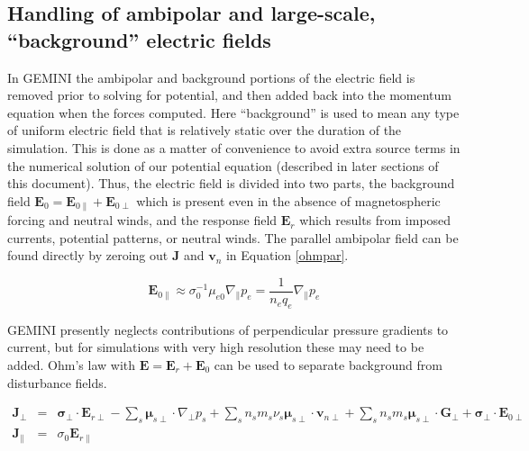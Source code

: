 \documentclass[11pt,letterpaper]{article}
\begin{document}


\subsection{Handling of ambipolar and large-scale, ``background'' electric fields}

In GEMINI the ambipolar and background portions of the electric field is removed prior to solving for potential, and then added back into the momentum equation when the forces computed.  Here ``background'' is used to mean any type of uniform electric field that is relatively static over the duration of the simulation.  This is done as a matter of convenience to avoid extra source terms in the numerical solution of our potential equation (described in later sections of this document).  Thus, the electric field is divided into two parts, the background field $\mathbf{E}_0 = \mathbf{E}_{0\parallel} + \mathbf{E}_{0\perp}$ which is present even in the absence of magnetospheric forcing and neutral winds, and the response field $\mathbf{E}_r$ which results from imposed currents, potential patterns, or neutral winds.  The parallel ambipolar field can be found directly by zeroing out $\mathbf{J}$ and $\mathbf{v}_n$ in Equation \ref{ohmpar}.  
\begin{linenomath*} \begin{equation}
\mathbf{E}_{0\parallel} \approx \sigma_0^{-1} \mu_{e0} \nabla_\parallel p_e = \frac{1}{n_e q_e} \nabla_\parallel p_e \label{Eambpar}
\end{equation} \end{linenomath*}
GEMINI presently neglects contributions of perpendicular pressure gradients to current, but for simulations with very high resolution these may need to be added.  Ohm's law with $\mathbf{E}=\mathbf{E}_r+\mathbf{E}_0$ can be used to separate background from disturbance fields.
\begin{linenomath*} \begin{eqnarray}
\mathbf{J}_\perp &=& \boldsymbol{\sigma}_\perp \cdot \mathbf{E}_{r\perp} - \sum_s \boldsymbol{\mu}_{s\perp} \cdot \nabla_\perp p_s + \sum_s n_s m_s \nu_s \boldsymbol{\mu}_{s\perp} \cdot \mathbf{v}_{n\perp} + \sum_s n_s m_s  \boldsymbol{\mu}_{s\perp} \cdot \mathbf{G}_\perp + \boldsymbol{\sigma}_\perp \cdot \mathbf{E}_{0\perp} \label{ohm2} \\
\mathbf{J}_\parallel &=& \sigma_0 \mathbf{E}_{r\parallel}
\end{eqnarray} \end{linenomath*}
\end{document}
